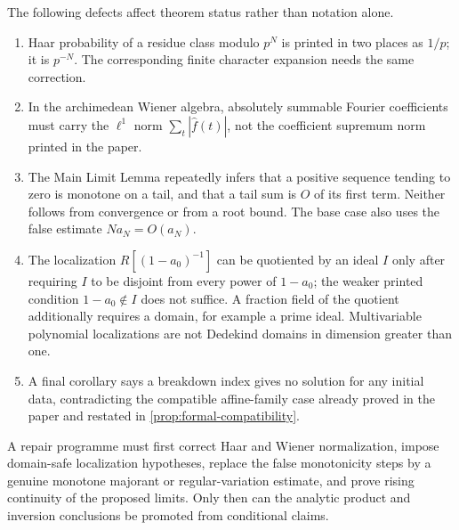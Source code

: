 The following defects affect theorem status rather than notation alone.
\begin{enumerate}[label=\textup{(\arabic*)}]
\item Haar probability of a residue class modulo $p^N$ is printed in two
      places as $1/p$; it is $p^{-N}$.  The corresponding finite character
      expansion needs the same correction.
\item In the archimedean Wiener algebra, absolutely summable Fourier
      coefficients must carry the $\ell^1$ norm
      $\sum_t|\widehat f(t)|$, not the coefficient supremum norm printed in
      the paper.
\item The Main Limit Lemma repeatedly infers that a positive sequence tending
      to zero is monotone on a tail, and that a tail sum is
      $O$ of its first term.  Neither follows from convergence or from a root
      bound.  The base case also uses the false estimate $Na_N=O(a_N)$.
\item The localization $R[(1-a_0)^{-1}]$ can be quotiented by an ideal $I$
      only after requiring $I$ to be disjoint from every power of
      $1-a_0$; the weaker printed condition $1-a_0\notin I$ does not suffice.
      A fraction field of the quotient additionally requires a domain, for
      example a prime ideal.  Multivariable polynomial localizations are not
      Dedekind domains in dimension greater than one.
\item A final corollary says a breakdown index gives no solution for any
      initial data, contradicting the compatible affine-family case already
      proved in the paper and restated in
      \cref{prop:formal-compatibility}.
\end{enumerate}

A repair programme must first correct Haar and Wiener normalization, impose
domain-safe localization hypotheses, replace the false monotonicity steps by
a genuine monotone majorant or regular-variation estimate, and prove rising
continuity of the proposed limits.  Only then can the analytic product and
inversion conclusions be promoted from conditional claims.
